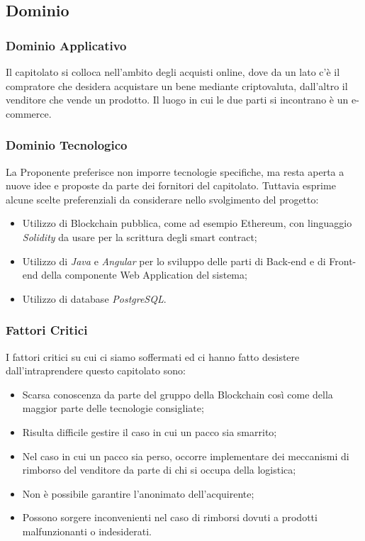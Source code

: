 \documentclass[11pt]{article}
\begin{document}
    \subsection{Dominio}
        \subsubsection{Dominio Applicativo}
        
        Il capitolato si colloca nell’ambito degli acquisti online, dove da un lato c’è il compratore che desidera acquistare un bene mediante criptovaluta, dall’altro il venditore che vende un prodotto. Il luogo in cui le due parti si incontrano è un e-commerce.
        \subsubsection{Dominio Tecnologico}
        
        La Proponente preferisce non imporre tecnologie specifiche, ma resta aperta a nuove idee e proposte da parte dei fornitori del capitolato. Tuttavia esprime alcune scelte preferenziali da considerare nello svolgimento del progetto:	
        \begin{itemize}
		    \item  Utilizzo di Blockchain pubblica, come ad esempio Ethereum, con linguaggio \textit{Solidity} da usare per la scrittura degli smart contract; 
			\item Utilizzo di \textit{Java} e \textit{Angular} per lo sviluppo delle parti di Back-end e di Front-end della componente Web Application del sistema; 
			\item Utilizzo di database \textit{PostgreSQL}.
		\end{itemize}
    
    \subsubsection{Fattori Critici}
    I fattori critici su cui ci siamo soffermati ed ci hanno fatto desistere dall'intraprendere questo capitolato sono:
   \begin{itemize}
		\item Scarsa conoscenza da parte del gruppo della Blockchain così come della maggior parte delle tecnologie consigliate;
		\item Risulta difficile gestire il caso in cui un pacco sia smarrito;
		\item Nel caso in cui un pacco sia perso, occorre implementare dei meccanismi di rimborso del venditore da parte di chi si occupa della logistica;
		\item Non è possibile garantire l’anonimato dell’acquirente;
		\item Possono sorgere inconvenienti nel caso di rimborsi dovuti a prodotti malfunzionanti o indesiderati.
	\end{itemize}
\end{document}
